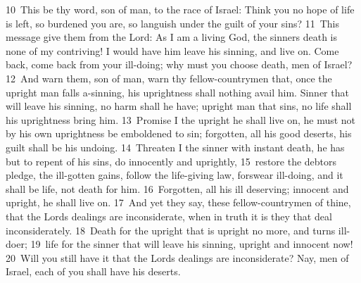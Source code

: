\documentclass[10pt]{book} %
\begin{document}
\textcolor{benred8}{10}~This be thy word, son of man, to the race of Israel: Think you no hope of life is left, so burdened you are, so languish under the guilt of your sins? \textcolor{benred8}{11}~This message give them from the Lord: As I am a living God, the sinner\textquotesingle s death is none of my contriving! I would have him leave his sinning, and live on. Come back, come back from your ill-doing; why must you choose death, men of Israel? \textcolor{benred8}{12}~And warn them, son of man, warn thy fellow-countrymen that, once the upright man falls a-sinning, his uprightness shall nothing avail him. Sinner that will leave his sinning, no harm shall he have; upright man that sins, no life shall his uprightness bring him. \textcolor{benred8}{13}~Promise I the upright he shall live on, he must not by his own uprightness be emboldened to sin; forgotten, all his good deserts, his guilt shall be his undoing. \textcolor{benred8}{14}~Threaten I the sinner with instant death, he has but to repent of his sins, do innocently and uprightly, \textcolor{benred8}{15}~restore the debtor\textquotesingle s pledge, the ill-gotten gains, follow the life-giving law, forswear ill-doing, and it shall be life, not death for him. \textcolor{benred8}{16}~Forgotten, all his ill deserving; innocent and upright, he shall live on. \textcolor{benred8}{17}~And yet they say, these fellow-countrymen of thine, that the Lord\textquotesingle s dealings are inconsiderate, when in truth it is they that deal inconsiderately. \textcolor{benred8}{18}~Death for the upright that is upright no more, and turns ill-doer; \textcolor{benred8}{19}~life for the sinner that will leave his sinning, upright and innocent now! \textcolor{benred8}{20}~Will you still have it that the Lord\textquotesingle s dealings are inconsiderate? Nay, men of Israel, each of you shall have his deserts.
\end{document}
